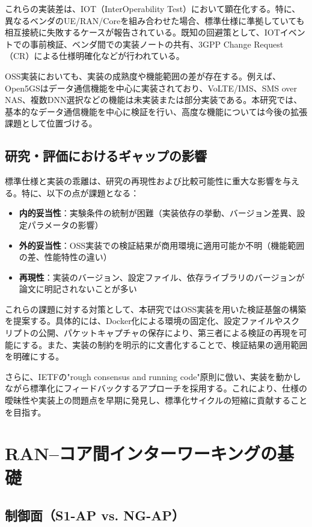 これらの実装差は、IOT（InterOperability Test）において顕在化する。特に、異なるベンダのUE/RAN/Coreを組み合わせた場合、標準仕様に準拠していても相互接続に失敗するケースが報告されている。既知の回避策として、IOTイベントでの事前検証、ベンダ間での実装ノートの共有、3GPP Change Request（CR）による仕様明確化などが行われている。

OSS実装においても、実装の成熟度や機能範囲の差が存在する。例えば、Open5GSはデータ通信機能を中心に実装されており、VoLTE/IMS、SMS over NAS、複数DNN選択などの機能は未実装または部分実装である。本研究では、基本的なデータ通信機能を中心に検証を行い、高度な機能については今後の拡張課題として位置づける。

\subsection{研究・評価におけるギャップの影響}

標準仕様と実装の乖離は、研究の再現性および比較可能性に重大な影響を与える。特に、以下の点が課題となる：

\begin{itemize}
\item \textbf{内的妥当性}：実験条件の統制が困難（実装依存の挙動、バージョン差異、設定パラメータの影響）
\item \textbf{外的妥当性}：OSS実装での検証結果が商用環境に適用可能か不明（機能範囲の差、性能特性の違い）
\item \textbf{再現性}：実装のバージョン、設定ファイル、依存ライブラリのバージョンが論文に明記されないことが多い
\end{itemize}

これらの課題に対する対策として、本研究ではOSS実装を用いた検証基盤の構築を提案する。具体的には、Docker化による環境の固定化、設定ファイルやスクリプトの公開、パケットキャプチャの保存により、第三者による検証の再現を可能にする。また、実装の制約を明示的に文書化することで、検証結果の適用範囲を明確にする。

さらに、IETFの"rough consensus and running code"原則に倣い、実装を動かしながら標準化にフィードバックするアプローチを採用する。これにより、仕様の曖昧性や実装上の問題点を早期に発見し、標準化サイクルの短縮に貢献することを目指す。

\section{RAN–コア間インターワーキングの基礎}

\subsection{制御面（S1-AP vs. NG-AP）}

